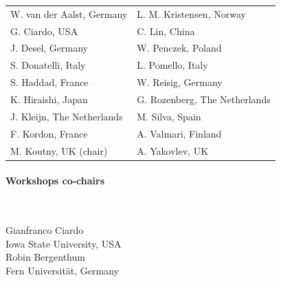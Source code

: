 \documentclass[10pt]{article}
\newcommand{\styleUniv}[1]{\textcolor{black!75}{#1}}
\begin{document}
\begin{multicols}{2}
\hspace*{-2em}\begin{tabular}{ll}
W. van der Aalst, Germany   & L. M. Kristensen, Norway \\
G. Ciardo, USA              & C. Lin, China \\
J. Desel, Germany           & W. Penczek, Poland \\
S. Donatelli, Italy         & L. Pomello, Italy \\
S. Haddad, France           & W. Reisig, Germany \\
K. Hiraishi, Japan          & G. Rozenberg, The Netherlands \\
J. Kleijn, The Netherlands  & M. Silva, Spain \\
F. Kordon, France           & A. Valmari, Finland \\
M. Koutny, UK (chair)       & A. Yakovlev, UK \\

\end{tabular}

\paragraph*{Workshops co-chairs} $ $
\vspace*{0.25em}

\noindent Gianfranco Ciardo \\
\indent \styleUniv{Iowa State University, USA} \\
\noindent Robin Bergenthum \\
\indent \styleUniv{Fern Universität, Germany}


\end{multicols}





\end{document}
